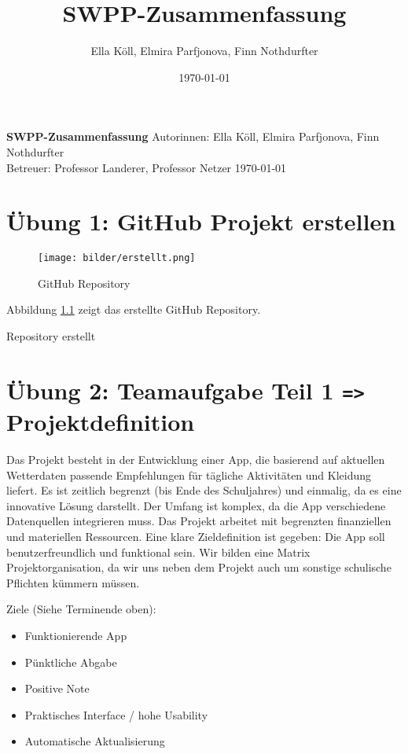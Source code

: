 \documentclass[a4paper,12pt]{report}
\title{SWPP-Zusammenfassung}
\author{Ella Köll, Elmira Parfjonova, Finn Nothdurfter}
\date{\today}
\begin{document}
\begin{titlepage}
    \centering
    \vspace*{1cm}
    \Huge
    \textbf{SWPP-Zusammenfassung}
    \vspace{0.5cm}
    \vfill
    \Large
    Autorinnen: Ella Köll, Elmira Parfjonova, Finn Nothdurfter \\
    Betreuer: Professor Landerer, Professor Netzer
    \vspace{0.8cm}
    \Large
    \today
\end{titlepage}

\tableofcontents

\chapter{Übung 1: GitHub Projekt erstellen}

\begin{figure}[H]
    \centering
    \texttt{[image: bilder/erstellt.png]}
    \caption{GitHub Repository}
    \label{fig:portrait}
\end{figure}

Abbildung \ref{fig:portrait} zeigt das erstellte GitHub Repository.

Repository erstellt

\chapter{Übung 2: Teamaufgabe Teil 1 \texttt{=>} Projektdefinition}

Das Projekt besteht in der Entwicklung einer App, die basierend auf aktuellen Wetterdaten passende Empfehlungen für tägliche Aktivitäten und Kleidung liefert. Es ist zeitlich begrenzt (bis Ende des Schuljahres) und einmalig, da es eine innovative Lösung darstellt. Der Umfang ist komplex, da die App verschiedene Datenquellen integrieren muss. Das Projekt arbeitet mit begrenzten finanziellen und materiellen Ressourcen. Eine klare Zieldefinition ist gegeben: Die App soll benutzerfreundlich und funktional sein.
Wir bilden eine Matrix Projektorganisation, da wir uns neben dem Projekt auch um sonstige schulische Pflichten kümmern müssen.

\vspace{1cm}

Ziele (Siehe Terminende oben):
\begin{itemize}[label=-] 
    \item Funktionierende App
    \item Pünktliche Abgabe
    \item Positive Note
    \item Praktisches Interface / hohe Usability
    \item Automatische Aktualisierung
\end{itemize}
\end{document}
